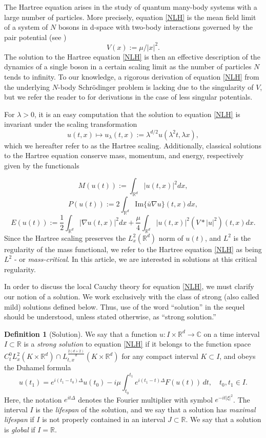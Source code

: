 \documentclass[reqno,11pt]{amsart}
\theoremstyle{plain}
\theoremstyle{definition}
\newtheorem{definition}[theorem]{Definition}
\numberwithin{equation}{section}
\numberwithin{theorem}{section}
\begin{document}
The Hartree equation arises in the study of quantum many-body systems with a large number of particles. More precisely, equation \eqref{NLH} is the mean field limit of a system of $N$ bosons in d-space with two-body interactions governed by the pair potential (see \cite{arxiv1}) 
\[
V(x) := \mu / |x|^2.
\]
The solution to the Hartree equation \eqref{NLH} is then an effective description of the dynamics of a single boson in a certain scaling limit as the number of particles $N$ tends to infinity. To our knowledge, a rigorous derivation of equation \eqref{NLH} from the underlying $N$-body Schr\"odinger problem is lacking due to the singularity of $V$, but we refer the reader to \cite{Ammari,Knowles} for derivations in the case of less singular potentials.

For $\lambda > $0, it is an easy computation that the solution to equation \eqref{NLH} is invariant under the scaling transformation
\[
u(t,x) \mapsto u_{\lambda}(t,x) := \lambda^{d/2}u(\lambda^2 t, \lambda x),
\]
which we hereafter refer to as the Hartree scaling. Additionally, classical solutions to the Hartree equation conserve mass, momentum, and energy, respectively given by the functionals

\[
M(u(t)) := \int_{\mathbb{R}^d} |u(t,x)|^2 dx,
\]
\[
P(u(t)) := 2 \int_{\mathbb{R}^d} \text{Im}\{\bar{u}\nabla u\}(t,x)dx,
\]
\[
E(u(t)) := \frac{1}{2} \int_{\mathbb{R}^d} |\nabla u(t,x)|^2 dx + \frac{\mu}{4} \int_{\mathbb{R}^d} |u(t,x)|^2 (V * |u|^2)(t,x)dx.
\]
Since the Hartree scaling preserves the $L_x^2(\mathbb{R}^d)$  norm of  $u(t)$, and $L^2$ is the regularity of the mass functional, we refer to the Hartree equation \eqref{NLH} as being  $L^2$ - or \emph{mass-critical}. In this article, we are interested in solutions at this critical regularity.


In order to discuss the local Cauchy theory for equation \eqref{NLH}, we must clarify our notion of a solution.  
We work exclusively with the class of strong (also called mild) solutions defined below. Thus, use of the word ``solution'' in the sequel should be understood, unless stated otherwise, as ``strong solution.''
\begin{definition}[Solution]
    We say that a function  $u : I \times \mathbb{R}^d \to \mathbb{C}$  on a time interval $I \subset \mathbb{R}$  is a \emph{strong solution} to equation \eqref{NLH} if it belongs to the function space  $C^0_{t} L_x^2(K \times \mathbb{R}^d) \cap L^{\frac{2(d+2)}{d}}_{t,x}(K \times \mathbb{R}^d)$ for any compact interval $K\subset I$, and obeys the Duhamel formula
\[
u(t_1) = e^{i(t_1-t_0)\Delta} u(t_0) - i\mu \int_{t_0}^{t_1} e^{i(t_1-t)\Delta} F(u(t)) \, dt, \quad t_0, t_1 \in I.
\]
Here, the notation $e^{it\Delta}$  denotes the Fourier multiplier with symbol $ e^{-it|\xi|^2} $. The interval  $I$  is the \emph{lifespan} of the solution, and we say that a solution has \emph{maximal lifespan} if  $I$  is not properly contained in an interval $J \subset \mathbb{R}$. We say that a solution is \emph{global} if  $I = \mathbb{R}$.
\end{definition}
\end{document}
